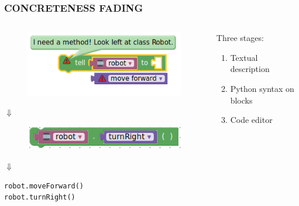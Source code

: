 \documentclass{beamer}
\let\theframetitle\frametitle
\renewcommand\frametitle[1]{\theframetitle{\MakeUppercase{#1}}}
\begin{document}
\begin{frame}[fragile]
\frametitle{Concreteness Fading}
\begin{columns}[onlytextwidth]
  \begin{column}{.45\textwidth}
    \begin{figure}
      \includegraphics[width=\textwidth]{../report/block_unfaded}
    \end{figure}
    \vspace{-7mm}\centerline{$\Downarrow $}\vspace{-2.5mm}
    \begin{figure}
      \includegraphics[width=\textwidth]{../report/block_faded}
    \end{figure}
    \vspace{-5mm}\centerline{$\Downarrow $}\vspace{-2.5mm}
\begin{verbatim}
robot.moveForward()
robot.turnRight()
\end{verbatim}
  \end{column}
  \begin{column}{.45\textwidth}
    Three stages:
    \begin{enumerate}
    \item Textual description
    \item Python syntax on blocks
    \item Code editor
    \end{enumerate}
  \end{column}
\end{columns}
\end{frame}
\end{document}
